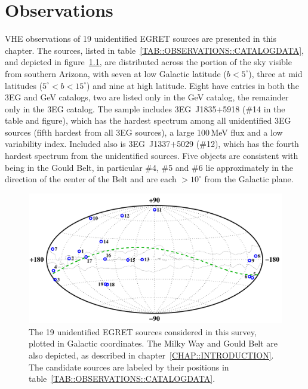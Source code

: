 \chapter{Observations}
\label{CHAP::OBSERVATIONS}

VHE observations of 19 unidentified EGRET sources are presented in this
chapter. The sources, listed in
table~\ref{TAB::OBSERVATIONS::CATALOGDATA}, and depicted in
figure~\ref{FIG::OBSERVATIONS::SOURCES}, are distributed across the
portion of the sky visible from southern Arizona, with seven at low
Galactic latitude ($b<5^\circ$), three at mid latitudes
($5^\circ<b<15^\circ$) and nine at high latitude. Eight have entries
in both the 3EG and GeV catalogs, two are listed only in the GeV
catalog, the remainder only in the 3EG catalog. The sample includes
3EG~J1835$+$5918 (\#14 in the table and figure), which has the hardest
spectrum among all unidentified 3EG sources (fifth hardest from all
3EG sources), a large 100\,MeV flux and a low variability
index. Included also is 3EG~J1337$+$5029 (\#12), which has the fourth
hardest spectrum from the unidentified sources. Five objects are
consistent with being in the Gould Belt, in particular \#4, \#5 and
\#6 lie approximately in the direction of the center of the Belt and
are each $>10^\circ$ from the Galactic plane.

\begin{figure}[h]
\includegraphics[angle=270,width=\textwidth]{plots/chap-observations/sources.pdf}
\caption{\label{FIG::OBSERVATIONS::SOURCES} The 19 unidentified EGRET
sources considered in this survey, plotted in Galactic coordinates. The
Milky Way and Gould Belt are also depicted, as described in 
chapter~\ref{CHAP::INTRODUCTION}. The candidate sources are labeled
by their positions in table~\ref{TAB::OBSERVATIONS::CATALOGDATA}.}
\end{figure}

